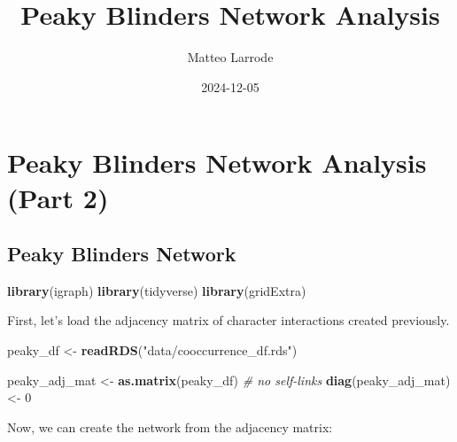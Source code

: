 \documentclass[
]{article}
\title{Peaky Blinders Network Analysis}
\author{Matteo Larrode}
\date{2024-12-05}
\newenvironment{Shaded}{\begin{snugshade}}{\end{snugshade}}
\newcommand{\AttributeTok}[1]{\textcolor[rgb]{0.13,0.29,0.53}{#1}}
\newcommand{\CommentTok}[1]{\textcolor[rgb]{0.56,0.35,0.01}{\textit{#1}}}
\newcommand{\ConstantTok}[1]{\textcolor[rgb]{0.56,0.35,0.01}{#1}}
\newcommand{\DecValTok}[1]{\textcolor[rgb]{0.00,0.00,0.81}{#1}}
\newcommand{\FunctionTok}[1]{\textcolor[rgb]{0.13,0.29,0.53}{\textbf{#1}}}
\newcommand{\NormalTok}[1]{#1}
\newcommand{\OtherTok}[1]{\textcolor[rgb]{0.56,0.35,0.01}{#1}}
\newcommand{\SpecialCharTok}[1]{\textcolor[rgb]{0.81,0.36,0.00}{\textbf{#1}}}
\newcommand{\StringTok}[1]{\textcolor[rgb]{0.31,0.60,0.02}{#1}}
\begin{document}
\maketitle

\hypertarget{peaky-blinders-network-analysis-part-2}{%
\section{Peaky Blinders Network Analysis (Part
2)}\label{peaky-blinders-network-analysis-part-2}}

\hypertarget{peaky-blinders-network}{%
\subsection{Peaky Blinders Network}\label{peaky-blinders-network}}

\begin{Shaded}
\begin{Highlighting}[]
\FunctionTok{library}\NormalTok{(igraph)}
\FunctionTok{library}\NormalTok{(tidyverse)}
\FunctionTok{library}\NormalTok{(gridExtra)}
\end{Highlighting}
\end{Shaded}

First, let's load the adjacency matrix of character interactions created
previously.

\begin{Shaded}
\begin{Highlighting}[]
\NormalTok{peaky\_df }\OtherTok{\textless{}{-}} \FunctionTok{readRDS}\NormalTok{(}\StringTok{"data/cooccurrence\_df.rds"}\NormalTok{)}

\NormalTok{peaky\_adj\_mat }\OtherTok{\textless{}{-}} \FunctionTok{as.matrix}\NormalTok{(peaky\_df)}
\CommentTok{\# no self{-}links}
\FunctionTok{diag}\NormalTok{(peaky\_adj\_mat) }\OtherTok{\textless{}{-}} \DecValTok{0}
\end{Highlighting}
\end{Shaded}

Now, we can create the network from the adjacency matrix:

\begin{Shaded}
\end{Shaded}
\end{document}
